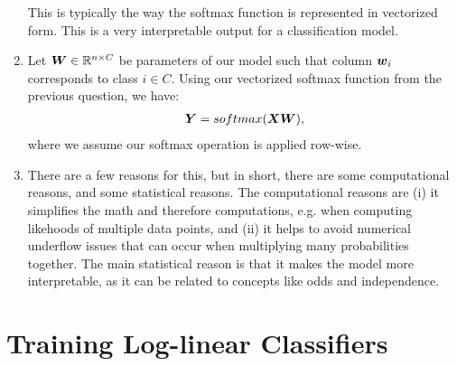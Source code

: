 \documentclass[11pt,a4paper]{article}
\begin{document}
\begin{enumerate}[label=(\alph*)]
          This is typically the way the softmax function is represented in
          vectorized form. 
          This is a very interpretable output for a classification model.
    \item Let ${\boldsymbol{W}}\in\mathbb{R}^{n\times C}$ be parameters of our model such that
          column ${\boldsymbol{w}}_i$ corresponds to class $i\in C$.
          Using our vectorized softmax function from the previous question, we
          have:
          \begin{align}
              {\boldsymbol{Y}} = softmax({\boldsymbol{X}}{\boldsymbol{W}}),
          \end{align}
          where we assume our softmax operation is applied row-wise.
    \item There are a few reasons for this, but in short, there are some
          computational reasons, and some statistical reasons.
          The computational reasons are (i) it simplifies the math and therefore
          computations, e.g. when computing likehoods of multiple data points,
          and (ii) it helps to avoid numerical underflow issues that
          can occur when multiplying many probabilities together.
          The main statistical reason is that it makes the model more
          interpretable, as it can be related to concepts like odds and
          independence.
\end{enumerate}

\section{Training Log-linear Classifiers}
\end{document}
